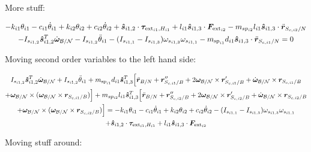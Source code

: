 \documentclass[paper]{aiaaNew}
\begin{document}
More stuff:

\begin{multline}
	-k_{i1} \theta_{i1} - c_{i1} \dot{\theta}_{i1} + k_{i2} \theta_{i2} + c_{i2} \dot{\theta}_{i2} + \bm{\hat{s}}_{i1,2} \cdot \bm \tau_{\text{ext}_{i1},H_{i1}}  + l_{i1} \bm{\hat{s}}_{i1,3} \cdot \bm F_{\text{ext}_{i2}}  - m_{sp_{i2}} l_{i1} \bm{\hat{s}}_{i1,3} \cdot \ddot{\bm{r}}_{S_{c,i2}/N} \\
	- I_{s_{i1,2}} \bm{\hat{s}}_{i1,2}^T \dot{\bm \omega}_{\cal{B/N}} - I_{s_{i1,2}} \ddot{\theta}_{i1} - (I_{s_{i1,1}} - I_{s_{i1,3}}) \omega_{s_{i1,3}} \omega_{s_{i1,1}} -m_{\text{sp}_{i1}} d_{i1} \bm{\hat{s}}_{i1,3} \cdot \ddot{\bm{r}}_{S_{c,i1}/N} = 0
\end{multline}

Moving second order variables to the left hand side:

\begin{multline}
I_{s_{i1,2}} \bm{\hat{s}}_{i1,2}^T \dot{\bm \omega}_{\cal{B/N}} + I_{s_{i1,2}} \ddot{\theta}_{i1} + m_{\text{sp}_{i1}} d_{i1} \bm{\hat{s}}_{i1,3}^T \Big[\ddot{\bm{r}}_{B/N} + \bm{r}''_{S_{c,i1}/B} + 2 \bm\omega_{\cal B/N} \times \bm{r}'_{S_{c,i1}/B} +  \dot{\bm\omega}_{\cal B/N} \times \bm{r}_{S_{c,i1}/B} \\
+ \bm\omega_{\cal B/N} \times (\bm\omega_{\cal B/N} \times \bm{r}_{S_{c,i1}/B})\Big] + m_{sp_{i2}} l_{i1} \bm{\hat{s}}_{i1,3}^T \Big[\ddot{\bm{r}}_{B/N} + \bm{r}''_{S_{c,i2}/B} + 2 \bm\omega_{\cal B/N} \times \bm{r}'_{S_{c,i2}/B} +  \dot{\bm\omega}_{\cal B/N} \times \bm{r}_{S_{c,i2}/B} \\
+ \bm\omega_{\cal B/N} \times (\bm\omega_{\cal B/N} \times \bm{r}_{S_{c,i2}/B})\Big]
= -k_{i1} \theta_{i1} - c_{i1} \dot{\theta}_{i1} + k_{i2} \theta_{i2} + c_{i2} \dot{\theta}_{i2} - (I_{s_{i1,1}} - I_{s_{i1,3}}) \omega_{s_{i1,3}} \omega_{s_{i1,1}} \\
+ \bm{\hat{s}}_{i1,2} \cdot \bm \tau_{\text{ext}_{i1},H_{i1}}
+ l_{i1} \bm{\hat{s}}_{i1,3} \cdot \bm F_{\text{ext}_{i2}} 
\end{multline}

Moving stuff around:
\end{document}
